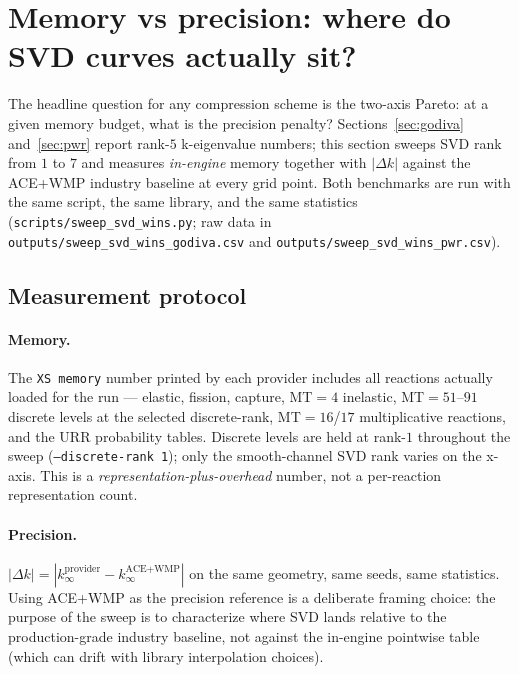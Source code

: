 \section{Memory vs precision: where do SVD curves actually sit?}
\label{sec:memprec}

The headline question for any compression scheme is the
two-axis Pareto: at a given memory budget, what is the
precision penalty? Sections~\ref{sec:godiva} and~\ref{sec:pwr}
report rank-$5$ k-eigenvalue numbers; this section sweeps SVD
rank from $1$ to $7$ and measures \emph{in-engine} memory
together with $|\Delta k|$ against the ACE+WMP industry
baseline at every grid point. Both benchmarks are run with the
same script, the same library, and the same statistics
(\texttt{scripts/sweep\_svd\_wins.py}; raw data in
\texttt{outputs/sweep\_svd\_wins\_godiva.csv} and
\texttt{outputs/sweep\_svd\_wins\_pwr.csv}).

\subsection{Measurement protocol}

\paragraph{Memory.}
The \texttt{XS memory} number printed by each provider includes
all reactions actually loaded for the run --- elastic, fission,
capture, MT$=4$ inelastic, MT$=51$--$91$ discrete levels at the
selected discrete-rank, MT$=16$/$17$ multiplicative reactions,
and the URR probability tables. Discrete levels are held at
rank-$1$ throughout the sweep (\texttt{--discrete-rank 1}); only
the smooth-channel SVD rank varies on the x-axis. This is a
\emph{representation-plus-overhead} number, not a per-reaction
representation count.

\paragraph{Precision.}
$|\Delta k| = |k^\text{provider}_\infty - k^\text{ACE+WMP}_\infty|$
on the same geometry, same seeds, same statistics. Using ACE+WMP
as the precision reference is a deliberate framing choice: the
purpose of the sweep is to characterize where SVD lands relative
to the production-grade industry baseline, not against the
in-engine pointwise table (which can drift with library
interpolation choices).

